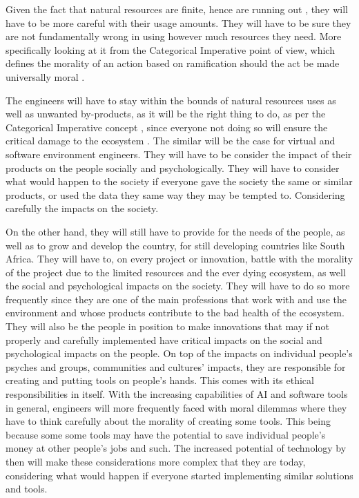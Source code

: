 \documentclass[12pt]{witseiepaper}
\begin{document}
    Given the fact that natural resources are finite, hence are running out \citep{subramanian2018crisis}, they will have to be more careful with their usage amounts. They will have to be sure they are not fundamentally wrong in using however much resources they need. More specifically looking at it from the Categorical Imperative point of view, which defines the morality of an action based on ramification should the act be made universally moral \citep{kant1993groundwork}.
    
    The engineers will have to stay within the bounds of natural resources uses as well as unwanted by-products, as it will be the right thing to do, as per the Categorical Imperative concept \citep{basara2018kant}, since everyone not doing so will ensure the critical damage to the ecosystem \citep{appannagari2017environmental}. The similar will be the case for virtual and software environment engineers. They will have to be consider the impact of their products on the people socially and psychologically. They will have to consider what would happen to the society if everyone gave the society the same or similar products, or used the data they same way they may be tempted to. Considering carefully the impacts on the society.  
    
    On the other hand, they will still have to provide for the needs of the people, as well as to grow and develop the country, for still developing countries like South Africa. They will have to, on every project or innovation, battle with the morality of the project due to the limited resources and the ever dying ecosystem, as well the social and psychological impacts on the society. They will have to do so more frequently since they are one of the main professions that work with and use the environment and whose products contribute to the bad health of the ecosystem. They will also be the people in position to make innovations that may if not properly and carefully implemented have critical impacts on the social and psychological impacts on the people. On top of the impacts on individual people's psyches and groups, communities and cultures' impacts, they are responsible for creating and putting tools on people's hands. This comes with its ethical responsibilities in itself. With the increasing capabilities of AI and software tools in general, engineers will more frequently faced with moral dilemmas where they have to think carefully about the morality of creating some tools. This being because some some tools may have the potential to save individual people's money at other people's jobs and such. The increased potential of technology by then will make these considerations more complex that they are today, considering what would happen if everyone started implementing similar solutions and tools.   
\end{document}
